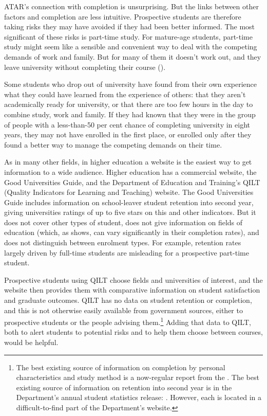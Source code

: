 ATAR's connection with completion is unsurprising. But the links between other factors and completion are less intuitive. Prospective students are therefore taking risks they may have avoided if they had been better informed. The most significant of these risks is part-time study. For mature-age students, part-time study might seem like a sensible and convenient way to deal with the competing demands of work and family. But for many of them it doesn't work out, and they leave university without completing their course ().

Some students who drop out of university have found from their own experience what they could have learned from the experience of others: that they aren't academically ready for university, or that there are too few hours in the day to combine study, work and family. If they had known that they were in the group of people with a less-than-50 per cent chance of completing university in eight years, they may not have enrolled in the first place, or enrolled only after they found a better way to manage the competing demands on their time.

As in many other fields, in higher education a website is the easiest way to get information to a wide audience. Higher education has a commercial website, the Good Universities Guide, and the Department of Education and Training's QILT (Quality Indicators for Learning and Teaching) website. The Good Universities Guide includes information on school-leaver student retention into second year, giving universities ratings of up to five stars on this and other indicators. But it does not cover other types of student, does not give information on fields of education (which, as  shows, can vary significantly in their completion rates), and does not distinguish between enrolment types. For example, retention rates largely driven by full-time students are misleading for a prospective part-time student.


Prospective students using QILT choose fields and universities of interest, and the website then provides them with comparative information on student satisfaction and graduate outcomes. QILT has no data on student retention or completion, and this is not otherwise easily available from government sources, either to prospective students or the people advising them.\footnote{The best existing source of information on completion by personal characteristics and study method is a now-regular report from the \textcite{DepartmentofEducationandTraining2017}. The best existing source of information on retention into second year is in the Department's annual student statistics release:
\textcite[][appendix~4]{DepartmentofEducationandTraining2017a}. However, each is located in a difficult-to-find part of the Department's website.} Adding that data to QILT, both to alert students to potential risks and to help them choose between courses, would be helpful.

